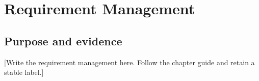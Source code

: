 \chapter{Requirement Management}
\label{chap:requirement_management}
\section{Purpose and evidence}
[Write the requirement management here. Follow the chapter guide and retain a stable label.]
